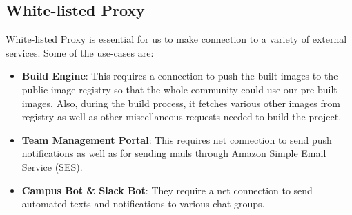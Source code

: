 \documentclass[10pt,a4paper]{article}
\begin{document}
\subsection{White-listed Proxy}
White-listed Proxy is essential for us to make connection to a variety of external services. Some of the use-cases are:
\begin{itemize}
    \item \textbf{Build Engine}: This requires a connection to push the built images to the public image registry so that the whole community could use our pre-built images. Also, during the build process, it fetches various other images from registry as well as other miscellaneous requests needed to build the project.
    \item \textbf{Team Management Portal}: This requires net connection to send push notifications as well as for sending mails through Amazon Simple Email Service (SES).
    \item \textbf{Campus Bot \& Slack Bot}: They require a net connection to send automated texts and notifications to various chat groups.
\end{itemize}




\end{document}
